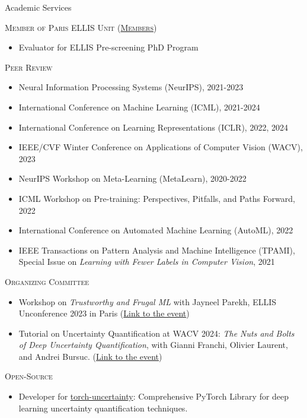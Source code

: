 \documentclass{resume} %
\begin{document}
\begin{rSection}{Academic Services}

\textsc{Member of Paris ELLIS Unit (\href{https://ellis.eu/units/paris}{Members})}
\begin{itemize}[label=$\cdot$]
    \item Evaluator for ELLIS Pre-screening PhD Program
\end{itemize}

\textsc{Peer Review}
\begin{itemize}[label=$\cdot$]
    \item Neural Information Processing Systems (NeurIPS), 2021-2023
    \item International Conference on Machine Learning (ICML), 2021-2024
    \item International Conference on Learning Representations (ICLR), 2022, 2024
    \item IEEE/CVF Winter Conference on Applications of Computer Vision (WACV), 2023
    \item NeurIPS Workshop on Meta-Learning (MetaLearn), 2020-2022
    \item ICML Workshop on Pre-training: Perspectives, Pitfalls, and Paths Forward, 2022
    \item International Conference on Automated Machine Learning (AutoML), 2022
    \item IEEE Transactions on Pattern Analysis and Machine Intelligence (TPAMI), \\ Special Issue on \emph{Learning with Fewer Labels in Computer Vision}, 2021
\end{itemize}

\textsc{Organizing Committee}
\begin{itemize}[label=$\cdot$]
    \item Workshop on \emph{Trustworthy and Frugal ML} with Jayneel Parekh, ELLIS Unconference 2023 in Paris (\href{https://ellisunconference2023.github.io/}{Link to the event})
    \item Tutorial on Uncertainty Quantification at WACV 2024: \emph{The Nuts and Bolts of Deep Uncertainty Quantification}, with Gianni Franchi, Olivier Laurent, and Andrei Bursuc. (\href{https://uqtutorial.github.io/}{Link to the event})
\end{itemize}

\textsc{Open-Source}
\begin{itemize}[label=$\cdot$]
    \item Developer for \href{https://github.com/ENSTA-U2IS/torch-uncertainty}{torch-uncertainty}: Comprehensive PyTorch Library for deep learning uncertainty quantification techniques. 
\end{itemize}

    
\end{rSection}
    
\end{document}

